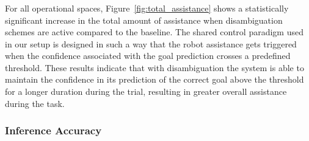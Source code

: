 \documentclass[letterpaper, 10 pt, conference]{ieeeconf}  %
\begin{document}
\subsubsection{}

For all operational spaces, Figure~\ref{fig:total_assistance} shows a statistically significant increase in the total amount of assistance when disambiguation schemes are active compared to the baseline.
The shared control paradigm used in our setup is designed in such a way that the robot assistance gets triggered when the confidence associated with the goal prediction crosses a predefined threshold. These results indicate that with disambiguation the system is able to maintain the confidence in its prediction of the correct goal above the threshold for a longer duration during the trial, resulting in greater overall assistance during the task.

\subsubsection{Inference Accuracy}
\end{document}
